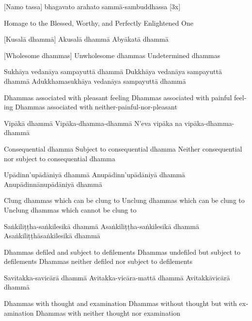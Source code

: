 [Namo tassa] bhagavato arahato sammā-sambuddhassa [3x]

\begin{english}
Homage to the Blessed, Worthy, and Perfectly Enlightened One
\end{english}

[Kusalā dhammā]
Akusalā dhammā
Abyākatā dhammā

\begin{english}
  [Wholesome dhammas]
  Unwholesome dhammas
  Undetermined dhammas
\end{english}

Sukhāya vedanāya sampayuttā dhammā
Dukkhāya vedanāya sampayuttā dhammā
Adukkhamasukhāya vedanāya sampayuttā dhammā

\begin{english}
  Dhammas associated with pleasant feeling
  Dhammas associated with painful feeling
  Dhammas associated with neither-painful-nor-pleasant
\end{english}

Vipākā dhammā
Vipāka-dhamma-dhammā
N’eva vipāka na vipāka-dhamma-dhammā

\begin{english}
  Consequential dhamma
  Subject to consequential dhamma
  Neither consequential nor subject to consequential dhamma
\end{english}

Upādinn’upādāniyā dhammā
Anupādinn’upādāniyā dhammā
Anupādinnānupādāniyā dhammā

\begin{english}
  Clung dhammas which can be clung to
  Unclung dhammas which can be clung to
  Unclung dhammas which cannot be clung to
\end{english}

Saṅkiliṭṭha-saṅkilesikā dhammā
Asaṅkiliṭṭha-saṅkilesikā dhammā
Asaṅkiliṭṭhāsaṅkilesikā dhammā

\begin{english}
  Dhammas defiled and subject to defilements
  Dhammas undefiled but subject to defilements
  Dhammas neither defiled nor subject to defilements
\end{english}

Savitakka-savicārā dhammā
Avitakka-vicāra-mattā dhammā
Avitakkāvicārā dhammā

\begin{english}
  Dhammas with thought and examination
  Dhammas without thought but with examination
  Dhammas with neither thought nor examination
\end{english}


